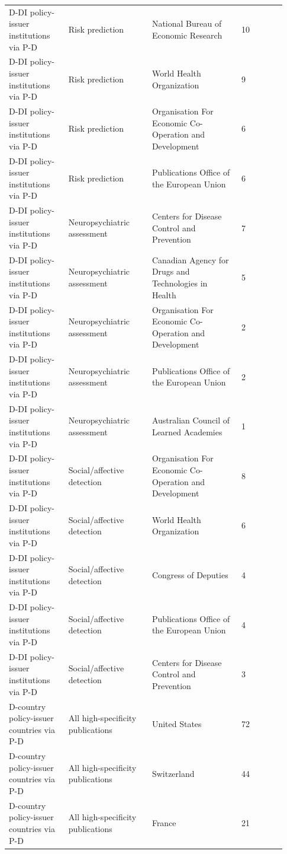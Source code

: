 \documentclass[11pt]{article}
\begin{document}
\begin{longtable}{@{}p{0.2\linewidth}@{\hspace{0.4em}}p{0.28\linewidth}@{\hspace{0.4em}}p{0.3\linewidth}@{\hspace{0.4em}}p{0.15\linewidth}@{}}
D-DI policy-issuer institutions via P-D & Risk prediction & National Bureau of Economic Research & 10 \\
D-DI policy-issuer institutions via P-D & Risk prediction & World Health Organization & 9 \\
D-DI policy-issuer institutions via P-D & Risk prediction & Organisation For Economic Co-Operation and Development & 6 \\
D-DI policy-issuer institutions via P-D & Risk prediction & Publications Office of the European Union & 6 \\
D-DI policy-issuer institutions via P-D & Neuropsychiatric assessment & Centers for Disease Control and Prevention & 7 \\
D-DI policy-issuer institutions via P-D & Neuropsychiatric assessment & Canadian Agency for Drugs and Technologies in Health & 5 \\
D-DI policy-issuer institutions via P-D & Neuropsychiatric assessment & Organisation For Economic Co-Operation and Development & 2 \\
D-DI policy-issuer institutions via P-D & Neuropsychiatric assessment & Publications Office of the European Union & 2 \\
D-DI policy-issuer institutions via P-D & Neuropsychiatric assessment & Australian Council of Learned Academies & 1 \\
D-DI policy-issuer institutions via P-D & Social/affective detection & Organisation For Economic Co-Operation and Development & 8 \\
D-DI policy-issuer institutions via P-D & Social/affective detection & World Health Organization & 6 \\
D-DI policy-issuer institutions via P-D & Social/affective detection & Congress of Deputies & 4 \\
D-DI policy-issuer institutions via P-D & Social/affective detection & Publications Office of the European Union & 4 \\
D-DI policy-issuer institutions via P-D & Social/affective detection & Centers for Disease Control and Prevention & 3 \\
D-country policy-issuer countries via P-D & All high-specificity publications & United States & 72 \\
D-country policy-issuer countries via P-D & All high-specificity publications & Switzerland & 44 \\
D-country policy-issuer countries via P-D & All high-specificity publications & France & 21 \\

\end{longtable}
\end{document}

